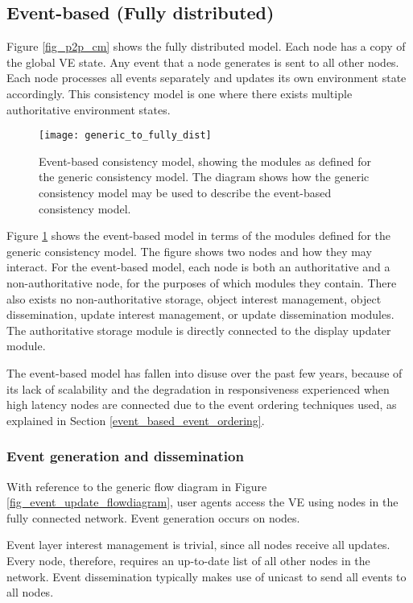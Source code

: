 \subsection{Event-based (Fully distributed)}
\label{classic_event_based}


Figure \ref{fig_p2p_cm} shows the fully distributed model. Each node has a copy of the global VE state. Any event that a node generates is sent to all other nodes. Each node processes all events separately and updates its own environment state accordingly. This consistency model is one where there exists multiple authoritative environment states.

\begin{figure}[htbp]
 \centering
 \texttt{[image: generic\_to\_fully\_dist]}
 \caption{Event-based consistency model, showing the modules as defined for the generic consistency model. The diagram shows how the generic consistency model may be used to describe the event-based consistency model.}
 \label{fig_generic_to_fully_dist}
\end{figure}
%
Figure \ref{fig_generic_to_fully_dist} shows the event-based model in terms of the modules defined for the generic consistency model. The figure shows two nodes and how they may interact. For the event-based model, each node is both an authoritative and a non-authoritative node, for the purposes of which modules they contain. There also exists no non-authoritative storage, object interest management, object dissemination, update interest management, or update dissemination modules. The authoritative storage module is directly connected to the display updater module.

The event-based model has fallen into disuse over the past few years, because of its lack of scalability and the degradation in responsiveness experienced when high latency nodes are connected due to the event ordering techniques used, as explained in Section \ref{event_based_event_ordering}.

\subsubsection{Event generation and dissemination}

With reference to the generic flow diagram in Figure \ref{fig_event_update_flowdiagram}, user agents access the VE using nodes in the fully connected network. Event generation occurs on nodes.

Event layer interest management is trivial, since all nodes receive all updates. Every node, therefore, requires an up-to-date list of all other nodes in the network. Event dissemination typically makes use of unicast to send all events to all nodes.

